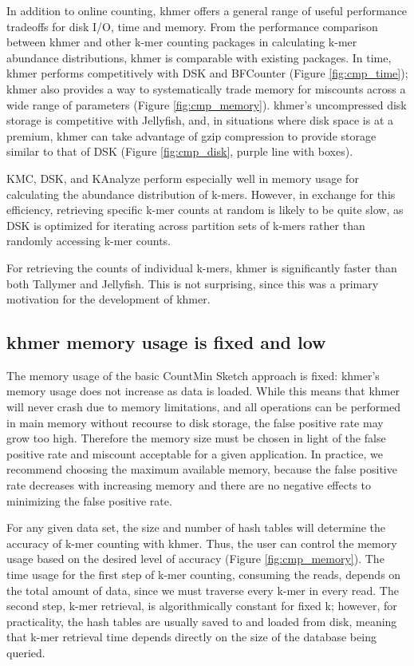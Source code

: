 \documentclass[10pt]{article}
\begin{document}
In addition to online counting, khmer offers a general range of useful
performance tradeoffs for disk I/O, time and memory.  From the
performance comparison between khmer and other k-mer counting packages
in calculating k-mer abundance distributions, khmer is comparable with
existing packages.  In time, khmer performs competitively with DSK and
BFCounter (Figure \ref{fig:cmp_time}); khmer also provides a way to
systematically trade memory for miscounts across a wide range of
parameters (Figure \ref{fig:cmp_memory}).  khmer's uncompressed disk
storage is competitive with Jellyfish, and, in situations where disk
space is at a premium, khmer can take advantage of gzip compression to
provide storage similar to that of DSK (Figure \ref{fig:cmp_disk},
purple line with boxes).

KMC, DSK, and KAnalyze perform especially well in memory usage for
calculating the abundance distribution of k-mers. However, in exchange
for this efficiency, retrieving specific k-mer counts at random is
likely to be quite slow, as DSK is optimized for iterating across
partition sets of k-mers rather than randomly accessing k-mer counts.

For retrieving the counts of individual k-mers, khmer is significantly
faster than both Tallymer and Jellyfish.  This is not surprising,
since this was a primary motivation for the development of khmer.

\subsection*{khmer memory usage is fixed and low}

The memory usage of the basic CountMin Sketch approach is fixed:
khmer's memory usage does not increase as data is loaded. While this
means that khmer will never crash due to memory limitations, and all
operations can be performed in main memory without recourse to disk
storage, the false positive rate may grow too high.  Therefore the
memory size must be chosen in light of the false positive rate and
miscount acceptable for a given application.  In practice, we
recommend choosing the maximum available memory, because the false
positive rate decreases with increasing memory and there are no
negative effects to minimizing the false positive rate.

For any given data set, the size and number of hash tables will
determine the accuracy of k-mer counting with khmer.  Thus, the user
can control the memory usage based on the desired level of accuracy
(Figure \ref{fig:cmp_memory}). The time usage for the first step of
k-mer counting, consuming the reads, depends on the total amount of
data, since we must traverse every k-mer in every read.  The second
step, k-mer retrieval, is algorithmically constant for fixed k;
however, for practicality, the hash tables are usually saved to and
loaded from disk, meaning that k-mer retrieval time depends directly
on the size of the database being queried.
\end{document}
